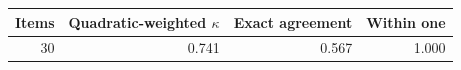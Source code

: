 \begin{tabular}{rrrr}
\toprule
Items & Quadratic-weighted $\kappa$ & Exact agreement & Within one \\
\midrule
30 & 0.741 & 0.567 & 1.000 \\
\bottomrule
\end{tabular}
